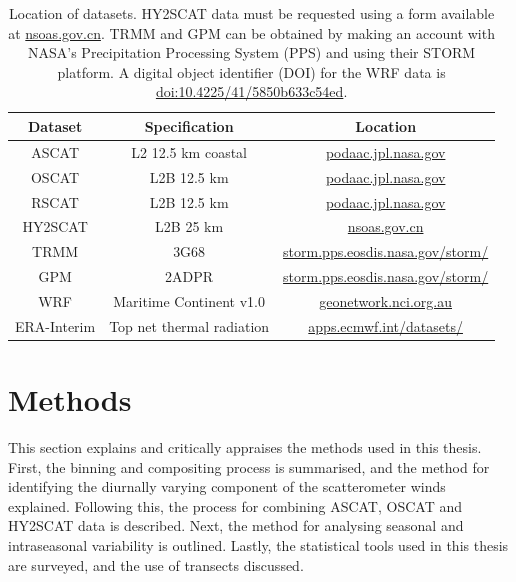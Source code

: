 \documentclass[12pt]{book}
\begin{document}
\begin{table} 
\begin{center}
\begin{tabular}{ c | c | c }    
Dataset & Specification & Location \\
\hline 
ASCAT & L2 12.5 km coastal & \href{podaac.jpl.nasa.gov}{podaac.jpl.nasa.gov} \\
OSCAT & L2B 12.5 km & \href{podaac.jpl.nasa.gov}{podaac.jpl.nasa.gov} \\
RSCAT & L2B 12.5 km & \href{podaac.jpl.nasa.gov}{podaac.jpl.nasa.gov} \\
HY2SCAT & L2B 25 km & \href{nsoas.gov.cn}{nsoas.gov.cn} \\
TRMM & 3G68 & \href{https://storm.pps.eosdis.nasa.gov/storm/}{storm.pps.eosdis.nasa.gov/storm/} \\
GPM & 2ADPR & \href{https://storm.pps.eosdis.nasa.gov/storm/}{storm.pps.eosdis.nasa.gov/storm/} \\
WRF & Maritime Continent v1.0 & \href{geonetwork.nci.org.au}{geonetwork.nci.org.au} \\
ERA-Interim & Top net thermal radiation & \href{http://apps.ecmwf.int/datasets/}{apps.ecmwf.int/datasets/}
\end{tabular}
\caption{Location of datasets. HY2SCAT data must be requested using a form available at \href{nsoas.gov.cn}{nsoas.gov.cn}. TRMM and GPM can be obtained by making an account with NASA's Precipitation Processing System (PPS) and using their STORM platform. A digital object identifier (DOI) for the WRF data is \href{https://geonetwork.nci.org.au/geonetwork/srv/eng/catalog.search\#/metadata/f5210\_8718\_6512\_7201}{doi:10.4225/41/5850b633c54ed}.}
\label{Tab:dataLoc}
\end{center}
\end{table}

\section{Methods}
This section explains and critically appraises the methods used in this thesis. First, the binning and compositing process is summarised, and the method for identifying the diurnally varying component of the scatterometer winds explained. Following this, the process for combining ASCAT, OSCAT and HY2SCAT data is described. Next, the method for analysing seasonal and intraseasonal variability is outlined. Lastly, the statistical tools used in this thesis are surveyed, and the use of transects discussed. 
\end{document}
